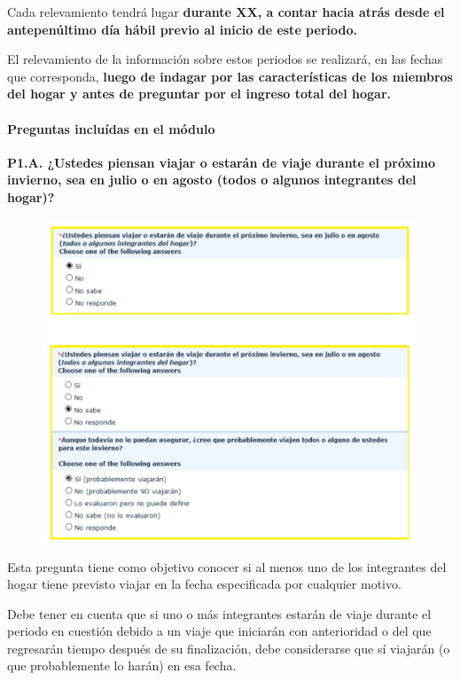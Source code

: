 \documentclass[
  openany]{book}
\begin{document}
Cada relevamiento tendrá lugar \textbf{durante XX, a contar hacia atrás desde el antepenúltimo día hábil previo al inicio de este periodo.}

El relevamiento de la información sobre estos periodos se realizará, en las fechas que corresponda, \textbf{luego de indagar por las características de los miembros del hogar y antes de preguntar por el ingreso total del hogar.}

\hypertarget{preguntas-incluuxeddas-en-el-muxf3dulo}{%
\paragraph{Preguntas incluídas en el módulo}\label{preguntas-incluuxeddas-en-el-muxf3dulo}}

\textbf{P1.A. ¿Ustedes piensan viajar o estarán de viaje durante el próximo invierno, sea en julio o en agosto (todos o algunos integrantes del hogar)?}

\begin{figure}

{\centering \includegraphics[width=1\linewidth]{imagenes/figura6-128} 

}

\end{figure}

Esta pregunta tiene como objetivo conocer si al menos uno de los integrantes del hogar tiene previsto viajar en la fecha especificada por cualquier motivo.

Debe tener en cuenta que si uno o más integrantes estarán de viaje durante el periodo en cuestión debido a un viaje que iniciarán con anterioridad o del que regresarán tiempo después de su finalización, debe considerarse que sí viajarán (o que probablemente lo harán) en esa fecha.
\end{document}

